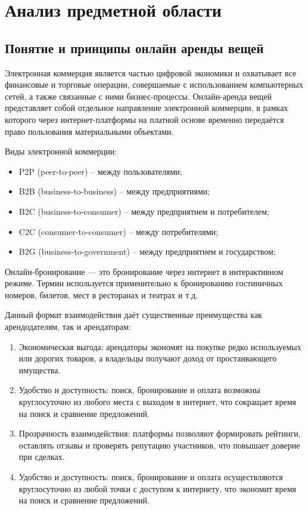 \section{Анализ предметной области}
\subsection{Понятие и принципы онлайн аренды вещей}

Электронная коммерция является частью цифровой экономики и охватывает все финансовые и торговые операции, совершаемые с использованием компьютерных сетей, а также связанные с ними бизнес-процессы. Онлайн-аренда вещей представляет собой отдельное направление электронной коммерции, в рамках которого через интернет-платформы на платной основе временно передаётся право пользования материальными объектами.

Виды электронной коммерции:
\begin{itemize}
\item P2P (peer-to-peer) – между пользователями;
\item B2B (business-to-business) – между предприятиями;
\item B2C (business-to-consumer) – между предприятием и потребителем;
\item C2C (consumer-to-consumer) – между потребителями;
\item B2G (business-to-government) – между предприятием и государством;
\end{itemize}

Онлайн-бронирование — это бронирование через интернет в интерактивном режиме. Термин используется применительно к бронированию гостиничных номеров, билетов, мест в ресторанах и театрах и т.д.

Данный формат взаимодействия даёт существенные преимущества как арендодателям, так и арендаторам:
\begin{enumerate}
\item Экономическая выгода: арендаторы экономят на покупке редко используемых или дорогих товаров, а владельцы получают доход от простаивающего имущества.
\item Удобство и доступность: поиск, бронирование и оплата возможны круглосуточно из любого места с выходом в интернет, что сокращает время на поиск и сравнение предложений.
\item Прозрачность взаимодействия: платформы позволяют формировать рейтинги, оставлять отзывы и проверять репутацию участников, что повышает доверие при сделках.
\item Удобство и доступность: поиск, бронирование и оплата осуществляются круглосуточно из любой точки с доступом к интернету, что экономит время на поиск и сравнение предложений.
\end{enumerate}

